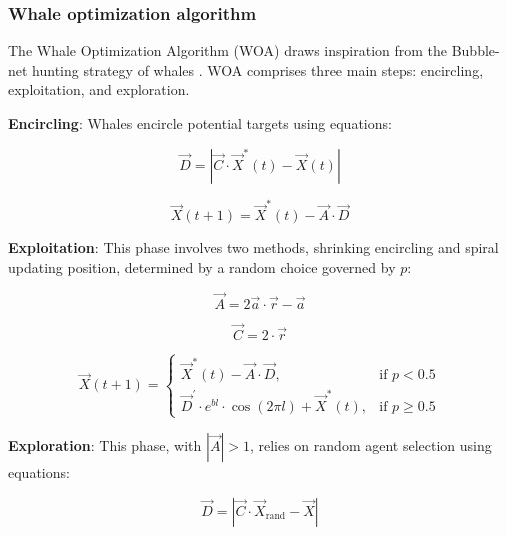 \documentclass{article}
\begin{document}
\subsubsection{Whale optimization algorithm }
The Whale Optimization Algorithm (WOA) draws inspiration from the Bubble-net hunting strategy of whales \cite{mirjalili2016whale}. WOA comprises three main steps: encircling, exploitation, and exploration.

\textbf{Encircling}: Whales encircle potential targets using equations:

\begin{equation}
\overrightarrow{D} = |\overrightarrow{C} \cdot \overrightarrow{X}^*(t) - \overrightarrow{X}(t)|
\end{equation}

\begin{equation}
\overrightarrow{X}(t+1) = \overrightarrow{X}^*(t) - \overrightarrow{A} \cdot \overrightarrow{D}
\end{equation}

\textbf{Exploitation}: This phase involves two methods, shrinking encircling and spiral updating position, determined by a random choice governed by \(p\):

\begin{equation}
\overrightarrow{A} = 2\overrightarrow{a} \cdot \overrightarrow{r} - \overrightarrow{a}
\end{equation}

\begin{equation}
\overrightarrow{C} = 2 \cdot \overrightarrow{r}
\end{equation}

\begin{equation}
\overrightarrow{X}(t+1) =
\begin{cases} 
\overrightarrow{X}^*(t) - \overrightarrow{A} \cdot \overrightarrow{D},  & \text{if } p < 0.5 \\
\overrightarrow{D}^\prime \cdot e^{bl} \cdot \cos(2 \pi l) + \overrightarrow{X}^*(t), & \text{if } p \ge 0.5 
\end{cases}
\end{equation}

\textbf{Exploration}: This phase, with \(|\overrightarrow{A}| > 1\), relies on random agent selection using equations:

\begin{equation}
\overrightarrow{D} = |\overrightarrow{C} \cdot \overrightarrow{X}_{\text{rand}} - \overrightarrow{X}|
\end{equation}
\end{document}
